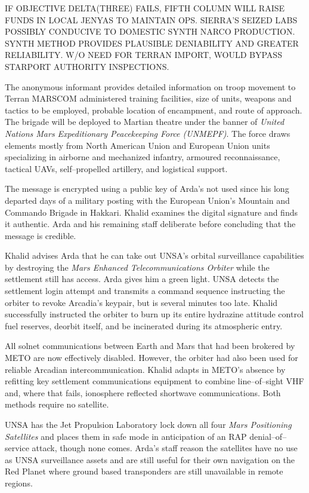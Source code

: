     \item IF OBJECTIVE DELTA(THREE) FAILS, FIFTH COLUMN WILL RAISE FUNDS IN LOCAL JENYAS TO MAINTAIN OPS. SIERRA'S SEIZED LABS POSSIBLY CONDUCIVE TO DOMESTIC SYNTH NARCO PRODUCTION. SYNTH METHOD PROVIDES PLAUSIBLE DENIABILITY AND GREATER RELIABILITY. W/O NEED FOR TERRAN IMPORT, WOULD BYPASS STARPORT AUTHORITY INSPECTIONS.
    \stopitemize
\stopitemize
\stopTimelineCorrespondenceDocument

The anonymous informant provides detailed information on troop movement to Terran MARSCOM administered training facilities, size of units, weapons and tactics to be employed, probable location of encampment, and route of approach. The brigade will be deployed to Martian theatre under the banner of {\it United Nations Mars Expeditionary Peacekeeping Force (UNMEPF)}. The force draws elements mostly from North American Union and European Union units specializing in airborne and mechanized infantry, armoured reconnaissance, tactical UAVs, self--propelled artillery, and logistical support.

The message is encrypted using a public key of Arda's not used since his long departed days of a military posting with the European Union's Mountain and Commando Brigade in Hakkari. Khalid examines the digital signature and finds it authentic. Arda and his remaining staff deliberate before concluding that the message is credible.
\StopTimelineDate

Khalid advises Arda that he can take out UNSA's orbital surveillance capabilities by destroying the {\it Mars Enhanced Telecommunications Orbiter} while the settlement still has access. Arda gives him a green light. UNSA detects the settlement login attempt and transmits a command sequence instructing the orbiter to revoke Arcadia's keypair, but is several minutes too late. Khalid successfully instructed the orbiter to burn up its entire hydrazine attitude control fuel reserves, deorbit itself, and be incinerated during its atmospheric entry.

All solnet communications between Earth and Mars that had been brokered by METO are now effectively disabled. However, the orbiter had also been used for reliable Arcadian intercommunication. Khalid adapts in METO's absence by refitting key settlement communications equipment to combine line--of--sight VHF and, where that fails, ionosphere reflected shortwave communications. Both methods require no satellite.

UNSA has the Jet Propulsion Laboratory lock down all four {\it Mars Positioning Satellites} and places them in safe mode in anticipation of an RAP denial--of--service attack, though none comes. Arda's staff reason the satellites have no use as UNSA surveillance assets and are still useful for their own navigation on the Red Planet where ground based transponders are still unavailable in remote regions.
\StopTimelineDate

